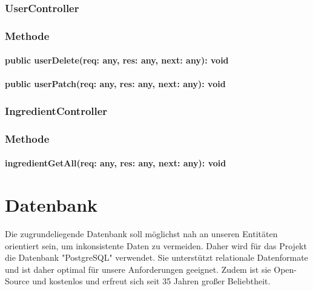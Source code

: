 \documentclass[parskip=full]{scrartcl}
\begin{document}
\subsubsection{UserController}
\subsubsection*{Methode}
\paragraph{public userDelete(req: any, res: any, next: any): void}
\paragraph{public userPatch(req: any, res: any, next: any): void}

\subsubsection{IngredientController}
\subsubsection*{Methode}
\paragraph{ingredientGetAll(req: any, res: any, next: any): void}

\newpage

\section{Datenbank}
Die zugrundeliegende Datenbank soll möglichst nah an unseren Entitäten orientiert sein, um inkonsistente Daten zu vermeiden. Daher wird für das Projekt die Datenbank "PostgreSQL" verwendet. Sie unterstützt relationale Datenformate und ist daher optimal für unsere Anforderungen geeignet. Zudem ist sie Open-Source und kostenlos und erfreut sich seit 35 Jahren großer Beliebtheit.
\end{document}
